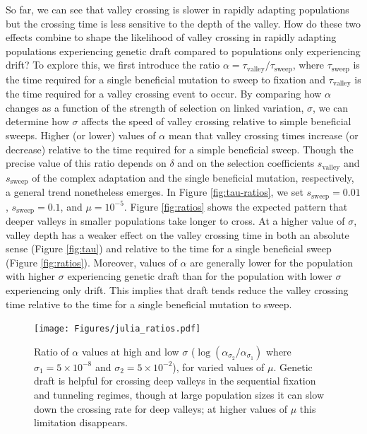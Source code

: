 \documentclass[10pt,twocolumn,twoside]{gsajnl}
\begin{document}
\begin{spacing}{1.5}
So far, we can see that valley crossing is slower in rapidly adapting populations but the crossing time is less sensitive to the depth of the valley.
How do these two effects combine to shape the likelihood of valley crossing in rapidly adapting populations experiencing genetic draft compared to populations only experiencing drift?
To explore this, we first introduce the ratio $\alpha = \tau_{\mathrm{valley}}/\tau_{\mathrm{sweep}}$, where $\tau_{\mathrm{sweep}}$ is the time required for a single beneficial mutation to sweep to fixation and $\tau_{\mathrm{valley}}$ is the time required for a valley crossing event to occur.
By comparing how $\alpha$ changes as a function of the strength of selection on linked variation, $\sigma$, we can determine how $\sigma$ affects the speed of valley crossing relative to simple beneficial sweeps. Higher (or lower) values of $\alpha$ mean that valley crossing times increase (or decrease) relative to the time required for a simple beneficial sweep.
Though the precise value of this ratio depends on $\delta$ and on the selection coefficients $s_{\mathrm{valley}}$ and $s_{\mathrm{sweep}}$ of the complex adaptation and the single beneficial mutation, respectively, a general trend nonetheless emerges.
In Figure \ref{fig:tau-ratios}, we set $s_{\mathrm{sweep}} = 0.01$, $s_{\mathrm{sweep}} = 0.1$, and $\mu = 10^{-5}$.
Figure \ref{fig:ratios} shows the expected pattern that deeper valleys in smaller populations take longer to cross.
At a higher value of $\sigma$, valley depth has a weaker effect on the valley crossing time in both an absolute sense (Figure \ref{fig:tau}) and relative to the time for a single beneficial sweep (Figure \ref{fig:ratios}).
Moreover, values of $\alpha$ are generally lower for the population with higher $\sigma$ experiencing genetic draft than for the population with lower $\sigma$ experiencing only drift.
This implies that draft tends reduce the valley crossing time relative to the time for a single beneficial mutation to sweep.

\begin{figure}[t]
\texttt{[image: Figures/julia\_ratios.pdf]}
\caption{Ratio of $\alpha$ values at high and low $\sigma$ ($\log \left( \alpha_{\sigma_2} / \alpha_{\sigma_1} \right)$ where $\sigma_1=5 \times 10^{-8}$ and $\sigma_2= 5 \times 10^{-2}$), for varied values of $\mu$. Genetic draft is helpful for crossing deep valleys in the sequential fixation and tunneling regimes, though at large population sizes it can slow down the crossing rate for deep valleys; at higher values of $\mu$ this limitation disappears.}
\label{fig:alpha_ratio}
\end{figure}


\end{spacing}
\end{document}
